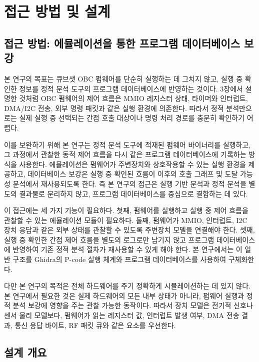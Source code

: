 \documentclass[master,korean,final]{kaist-ucs}
\begin{document}
\chapter{접근 방법 및 설계}

\section{접근 방법: 에뮬레이션을 통한 프로그램 데이터베이스 보강}

본 연구의 목표는 큐브샛 OBC 펌웨어를 단순히 실행하는 데 그치지 않고, 실행 중 확인한 정보를 정적 분석 도구의 프로그램 데이터베이스에 반영하는 것이다. 3장에서 설명한 것처럼 OBC 펌웨어의 제어 흐름은 MMIO 레지스터 상태, 타이머와 인터럽트, DMA/I2C 전송, 외부 명령 패킷과 같은 실행 환경에 의존한다. 따라서 정적 분석만으로는 실제 실행 중 선택되는 간접 호출 대상이나 명령 처리 경로를 충분히 확인하기 어렵다.

이를 보완하기 위해 본 연구는 정적 분석 도구에 적재된 펌웨어 바이너리를 실행하고, 그 과정에서 관찰한 동적 제어 흐름을 다시 같은 프로그램 데이터베이스에 기록하는 방식을 사용한다. 에뮬레이션은 펌웨어가 주변장치와 상호작용할 수 있는 실행 환경을 제공하고, 데이터베이스 보강은 실행 중 확인된 흐름이 이후의 호출 그래프 및 도달 가능성 분석에서 재사용되도록 한다. 즉 본 연구의 접근은 실행 기반 분석과 정적 분석을 별도의 결과물로 분리하지 않고, 프로그램 데이터베이스를 중심으로 결합하는 데 있다.

이 접근에는 세 가지 기능이 필요하다. 첫째, 펌웨어를 실행하고 실행 중 제어 흐름을 관찰할 수 있는 에뮬레이션 모듈이 필요하다. 둘째, 펌웨어가 MMIO, 인터럽트, I2C 장치 응답과 같은 외부 상태를 관찰할 수 있도록 주변장치 모델을 연결해야 한다. 셋째, 실행 중 확인한 간접 제어 흐름을 별도의 로그로만 남기지 않고 프로그램 데이터베이스에 반영하여 기존 정적 분석 절차가 재사용할 수 있게 해야 한다. 본 연구에서는 이 일반 구조를 Ghidra의 P-code 실행 체계와 프로그램 데이터베이스를 사용하여 구체화한다.

다만 본 연구의 목적은 전체 하드웨어를 주기 정확하게 시뮬레이션하는 데 있지 않다. 본 연구에서 필요한 것은 실제 하드웨어의 모든 내부 상태가 아니라, 펌웨어 실행과 정적 분석 보강에 영향을 주는 관찰 가능한 동작이다. 따라서 장치 모델은 전기적 신호나 센서 물리 모델보다, 펌웨어가 읽는 레지스터 값, 인터럽트 발생 여부, DMA 전송 결과, 통신 응답 바이트, RF 패킷 큐와 같은 요소를 우선한다.

\section{설계 개요}
\end{document}
